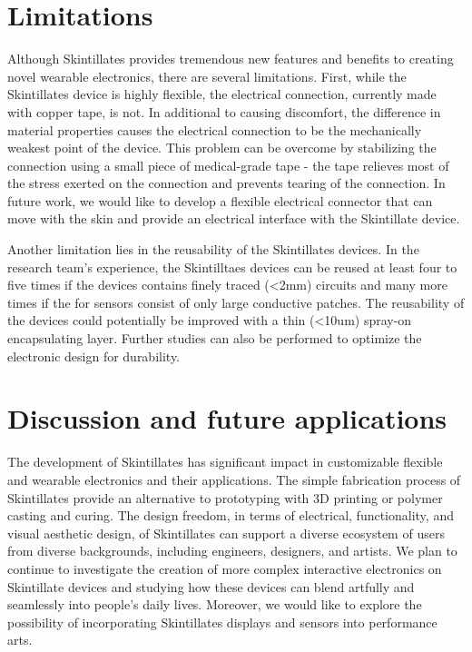 \documentclass{sigchi}
\begin{document}
\section {Limitations}
Although Skintillates provides tremendous new features and benefits to creating novel wearable electronics, there are several limitations. First, while the Skintillates device is highly flexible, the electrical connection, currently made with copper tape, is not. In additional to causing discomfort, the difference in material  properties causes the electrical connection to be the mechanically weakest point of the device. This problem can be overcome by stabilizing the connection using a small piece of medical-grade tape - the tape relieves most of the stress exerted on the connection and prevents tearing of the connection. In future work, we would like to develop a flexible electrical connector that can move with the skin and provide an electrical interface with the Skintillate device. 

Another limitation lies in the reusability of the Skintillates devices. In the research team's experience, the Skintilltaes devices can be reused at least four to five times if the devices contains finely traced (\textless 2mm) circuits and many more times if the for sensors consist of only large conductive patches. The reusability of the devices could potentially be improved with a thin (\textless10um) spray-on encapsulating layer. Further studies can also be performed to optimize the electronic design for durability. 

\section {Discussion and future applications}
The development of Skintillates has significant impact in customizable flexible and wearable electronics and their applications. The simple fabrication process of Skintillates provide an alternative to prototyping with 3D printing or polymer casting and curing.  The design freedom, in terms of electrical, functionality, and visual aesthetic design, of Skintillates can support a diverse ecosystem of users from diverse backgrounds, including engineers, designers, and artists. We plan to continue to investigate the creation of more complex interactive electronics on Skintillate devices and studying how these devices can blend artfully and seamlessly into people's daily lives. Moreover, we would like to explore the possibility of incorporating Skintillates displays and sensors into performance arts. 
\end{document}
